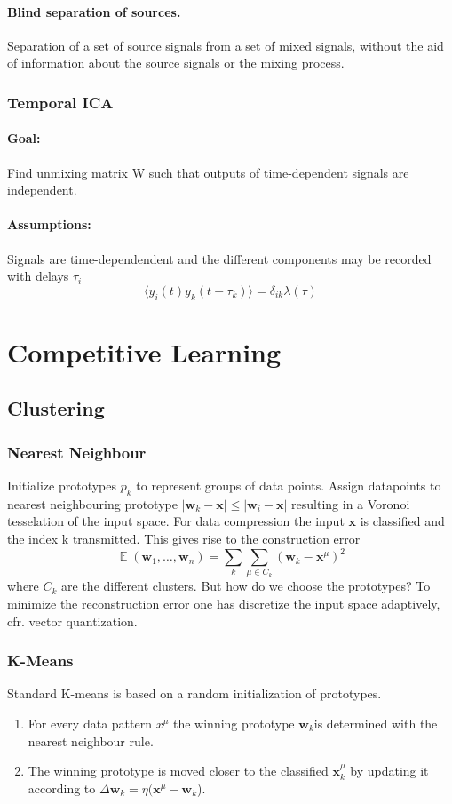 \documentclass[11pt]{article}
\DeclareMathOperator{\E}{\mathbb{E}}
\newcommand\abs[1]{\left|#1\right|}
\begin{document}
\paragraph{Blind separation of sources.} Separation of a set of source signals from a set of mixed signals, without the aid of information about the source signals or the mixing process.

\subsubsection{Temporal ICA}
\paragraph{Goal:} Find unmixing matrix W such that outputs of time-dependent signals are independent. 
\paragraph{Assumptions:} Signals are time-dependendent and the different components may be recorded with delays $\tau_i$
\[
	\langle y_i(t)y_k(t-\tau_k) \rangle = \delta_{ik}\lambda(\tau)
\]
\section{Competitive Learning}

\subsection{Clustering}
\subsubsection{Nearest Neighbour}
Initialize prototypes $p_k$ to represent groups of data points. Assign datapoints to nearest neighbouring prototype $\abs{\mathbf{w}_k-\mathbf{x}}\leq\abs{\mathbf{w}_i-\mathbf{x}}$ resulting in a Voronoi tesselation of the input space. For data compression the input $\mathbf{x}$ is classified and the index k transmitted. This gives rise to the construction error
\[
\E(\mathbf{w}_1, \dots, \mathbf{w}_n) = \sum_k \sum_{\mu \in C_k} (\mathbf{w}_k-\mathbf{x}^\mu)^2
\]
where $C_k$ are the different clusters.
But how do we choose the prototypes? To minimize the reconstruction error one has discretize the input space adaptively, cfr. vector quantization.
\subsubsection{K-Means}
Standard K-means is based on a random initialization of prototypes. 
\begin{enumerate}
\item For every data pattern $x^\mu$ the winning prototype $\mathbf{w}_k$is determined with the nearest neighbour rule.
\item The winning prototype is moved closer to the classified $\mathbf{x}_k^\mu$ by updating it according to $\Delta \mathbf{w}_k = \eta (\mathbf{x}^\mu - \mathbf{w}_k$).
\end{enumerate}
\end{document}
